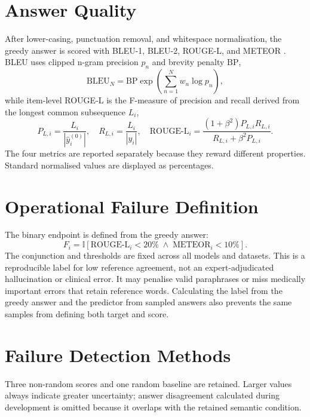 \section{Answer Quality}

After lower-casing, punctuation removal, and whitespace normalisation, the greedy answer is scored with BLEU-1, BLEU-2, ROUGE-L, and METEOR \citep{papineni2002bleu,lin2004rouge,banerjee2005meteor}. BLEU uses clipped n-gram precision $p_n$ and brevity penalty $\mathrm{BP}$,
\begin{equation}
\mathrm{BLEU}_N=\mathrm{BP}\exp\!\left(\sum_{n=1}^{N}w_n\log p_n\right),
\end{equation}
while item-level ROUGE-L is the F-measure of precision and recall derived from the longest common subsequence $L_i$,
\begin{equation}
P_{L,i}=\frac{L_i}{|\hat y_i^{(0)}|},\quad R_{L,i}=\frac{L_i}{|y_i|},\quad
\mathrm{ROUGE\mbox{-}L}_i=\frac{(1+\beta^2)P_{L,i}R_{L,i}}{R_{L,i}+\beta^2P_{L,i}}.
\end{equation}
The four metrics are reported separately because they reward different properties. Standard normalised values are displayed as percentages.

\section{Operational Failure Definition}

The binary endpoint is defined from the greedy answer:
\begin{equation}
F_i=\mathbb{I}[\mathrm{ROUGE\mbox{-}L}_i<20\%\;\land\;\mathrm{METEOR}_i<10\%].
\end{equation}
The conjunction and thresholds are fixed across all models and datasets. This is a reproducible label for low reference agreement, not an expert-adjudicated hallucination or clinical error. It may penalise valid paraphrases or miss medically important errors that retain reference words. Calculating the label from the greedy answer and the predictor from sampled answers also prevents the same samples from defining both target and score.

\section{Failure Detection Methods}

Three non-random scores and one random baseline are retained. Larger values always indicate greater uncertainty; answer disagreement calculated during development is omitted because it overlaps with the retained semantic condition.

